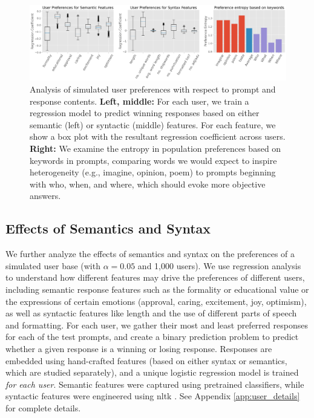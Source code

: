 \begin{figure}[t]
    \centering 
    \includegraphics[width=\linewidth]{figures/syn_sem_ent.png}
    \caption{Analysis of simulated user preferences with respect to prompt and response contents.
    \textbf{Left, middle:} For each user, we train a regression model to predict winning responses based on either semantic (left) or syntactic (middle) features.  For each feature, we show a box plot with the resultant regression coefficient across users.
    \textbf{Right:} We examine the entropy in population preferences based on keywords in prompts, comparing words we would expect to inspire heterogeneity (e.g., imagine, opinion, poem) to prompts beginning with who, when, and where, which should evoke more objective answers. 
    }
    \label{fig:sem_syn}
\end{figure}

\subsection{Effects of Semantics and Syntax}


We further analyze the effects of semantics and syntax on the preferences of a simulated user base (with $\alpha=0.05$ and 1,000 users).  We use regression analysis to understand how different features may drive the preferences of different users, including semantic response features such as the formality or educational value or the expressions of certain emotions (approval, caring, excitement, joy, optimism), as well as syntactic features like length and the use of different parts of speech and formatting.
For each user, we gather their most and least preferred responses for each of the test prompts, and create a binary prediction problem to predict whether a given response is a winning or losing response.
Responses are embedded using hand-crafted features (based on either syntax or semantics, which are studied separately), and a unique logistic regression model is trained \textit{for each user}.
Semantic features were captured using pretrained classifiers, while syntactic features were engineered using nltk \citep{bird-loper-2004-nltk}.  See Appendix \ref{app:user_details} for complete details.

